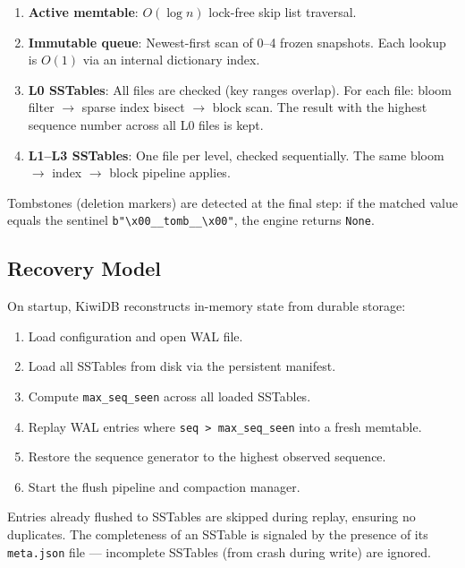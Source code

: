 \documentclass[conference]{IEEEtran}
\begin{document}
\begin{enumerate}[leftmargin=*]
    \item \textbf{Active memtable}: $O(\log n)$ lock-free skip list traversal.
    \item \textbf{Immutable queue}: Newest-first scan of 0--4 frozen snapshots. Each lookup is $O(1)$ via an internal dictionary index.
    \item \textbf{L0 SSTables}: All files are checked (key ranges overlap). For each file: bloom filter $\rightarrow$ sparse index bisect $\rightarrow$ block scan. The result with the highest sequence number across all L0 files is kept.
    \item \textbf{L1--L3 SSTables}: One file per level, checked sequentially. The same bloom $\rightarrow$ index $\rightarrow$ block pipeline applies.
\end{enumerate}

Tombstones (deletion markers) are detected at the final step: if the matched value equals the sentinel \texttt{b"\textbackslash x00\_\_tomb\_\_\textbackslash x00"}, the engine returns \texttt{None}.

\subsection{Recovery Model}

On startup, KiwiDB reconstructs in-memory state from durable storage:

\begin{enumerate}[leftmargin=*]
    \item Load configuration and open WAL file.
    \item Load all SSTables from disk via the persistent manifest.
    \item Compute \texttt{max\_seq\_seen} across all loaded SSTables.
    \item Replay WAL entries where \texttt{seq > max\_seq\_seen} into a fresh memtable.
    \item Restore the sequence generator to the highest observed sequence.
    \item Start the flush pipeline and compaction manager.
\end{enumerate}

Entries already flushed to SSTables are skipped during replay, ensuring no duplicates. The completeness of an SSTable is signaled by the presence of its \texttt{meta.json} file --- incomplete SSTables (from crash during write) are ignored.
\end{document}
